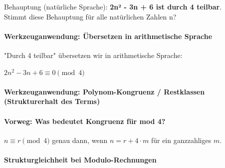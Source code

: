 \documentclass{article}
\begin{document}
        Behauptung (natürliche Sprache): \textbf{2n² - 3n + 6 ist durch 4 teilbar}.\\
        Stimmt diese Behauptung für alle natürlichen Zahlen n?
      


      \paragraph{Werkzeuganwendung: Übersetzen in arithmetische Sprache}
      

        "Durch 4 teilbar" übersetzen wir in arithmetische Sprache:
      

      
          $2n^2 - 3n + 6 \equiv 0 \pmod{4}$
      


      \paragraph{Werkzeuganwendung: Polynom-Kongruenz / Restklassen (Strukturerhalt des Terms)}

      \paragraph{Vorweg: Was bedeutet Kongruenz für mod 4?}
      
      $n \equiv r \pmod{4}$ genau dann, wenn $n = r + 4\cdot m$ für ein ganzzahliges $m$.
      


      \paragraph{
        Strukturgleichheit bei Modulo-Rechnungen
      }
\end{document}
